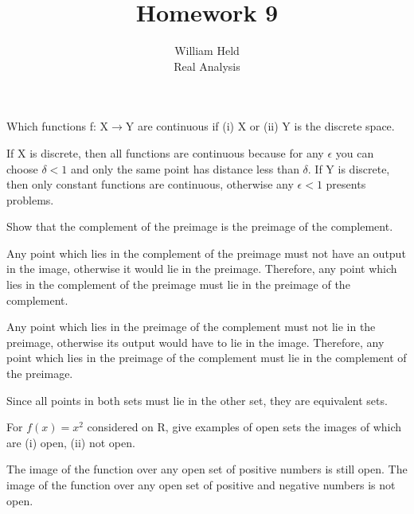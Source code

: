 \documentclass[12pt]{article}
\newenvironment{exercise}[2][Exercise]{\begin{trivlist}
\item[\hskip \labelsep {\bfseries #1}\hskip \labelsep {\bfseries #2.}]}{\end{trivlist}}
\begin{document}
 
 
 
\title{Homework 9}%
\author{William Held\\ %
Real Analysis} %

\newcommand{\norm}[1]{\left\lVert#1\right\rVert}
\newcommand{\abs}[1]{|#1|}
\newcommand{\ceil}[1]{\left \lceil #1 \right \rceil }
\newcommand{\floor}[1]{\left \lfloor #1 \right \rfloor }
\let\biconditional\leftrightarrow
\maketitle

\begin{exercise}{1.1}
Which functions f: X$\rightarrow$Y are continuous if (i) X or (ii) Y is the discrete space.
\end{exercise} 
If X is discrete, then all functions are continuous because for any $\epsilon$ you can choose $\delta < 1$ and only the same point has distance less than $\delta$.
If Y is discrete, then only constant functions are continuous, otherwise any $\epsilon < 1$ presents problems.
\begin{exercise}{1.2}
Show that the complement of the preimage is the preimage of the complement.
\end{exercise} 
Any point which lies in the complement of the preimage must not have an output in the image, otherwise it would lie in the preimage. Therefore, any point which lies in the complement of the preimage must lie in the preimage of the complement.

Any point which lies in the preimage of the complement must not lie in the preimage, otherwise its output would have to lie in the image. Therefore, any point which lies in the preimage of the complement must lie in the complement of the preimage.

Since all points in both sets must lie in the other set, they are equivalent sets.
\begin{exercise}{1.3}
For $f(x)=x^2$ considered on R, give examples of open sets the images of which are (i) open, (ii) not open.
\end{exercise}
The image of the function over any open set of positive numbers is still open.
The image of the function over any open set of positive and negative numbers is not open.
\end{document}
